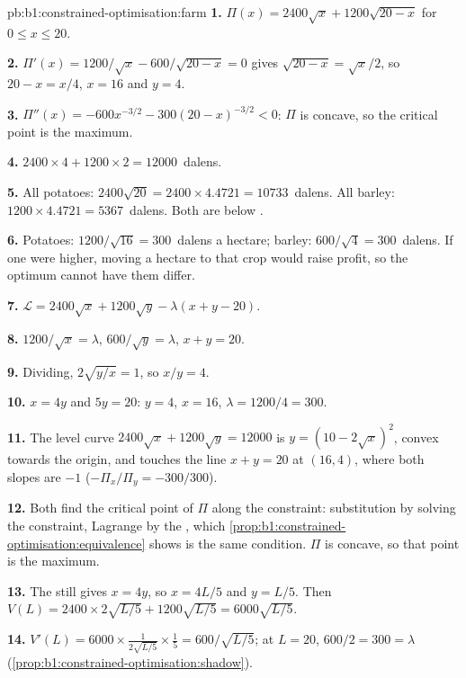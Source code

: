 \begin{solution}{pb:b1:constrained-optimisation:farm}
\textbf{1.} $\Pi(x) = 2400\sqrt x + 1200\sqrt{20 - x}$ for $0 \le x \le 20$.

\textbf{2.} $\Pi'(x) = 1200/\sqrt x - 600/\sqrt{20 - x} = 0$ gives
$\sqrt{20 - x} = \sqrt x/2$, so $20 - x = x/4$, $x = 16$ and $y = 4$.

\textbf{3.} $\Pi''(x) = -600x^{-3/2} - 300(20 - x)^{-3/2} < 0$: $\Pi$ is
concave, so the critical point is the maximum.

\textbf{4.} $2400 \times 4 + 1200 \times 2 = \num{12000}$~dalens.

\textbf{5.} All potatoes: $2400\sqrt{20} = 2400 \times 4.4721 = \num{10733}$~dalens.
All barley: $1200 \times 4.4721 = \num{5367}$~dalens. Both are below .

\textbf{6.} Potatoes: $1200/\sqrt{16} = \num{300}$~dalens a hectare; barley:
$600/\sqrt 4 = \num{300}$~dalens. If one were higher, moving a hectare to that crop
would raise profit, so the optimum cannot have them differ.

\textbf{7.} $\mathcal L = 2400\sqrt x + 1200\sqrt y - \lambda(x + y - 20)$.

\textbf{8.} $1200/\sqrt x = \lambda$, $600/\sqrt y = \lambda$, $x + y = 20$.

\textbf{9.} Dividing, $2\sqrt{y/x} = 1$, so $x/y = 4$.

\textbf{10.} $x = 4y$ and $5y = 20$: $y = 4$, $x = 16$, $\lambda = 1200/4 = 300$.

\textbf{11.} The level curve $2400\sqrt x + 1200\sqrt y = 12000$ is
$y = (10 - 2\sqrt x)^2$, convex towards the origin, and touches the line
$x + y = 20$ at $(16, 4)$, where both slopes are $-1$ ($-\Pi_x/\Pi_y = -300/300$).

\textbf{12.} Both find the critical point of $\Pi$ along the constraint:
substitution by solving the constraint, Lagrange by the ,
which \cref{prop:b1:constrained-optimisation:equivalence} shows is the same
condition. $\Pi$ is concave, so that point is the maximum.

\textbf{13.} The  still gives $x = 4y$, so $x = 4L/5$ and
$y = L/5$. Then $V(L) = 2400 \times 2\sqrt{L/5} + 1200\sqrt{L/5} = 6000\sqrt{L/5}$.

\textbf{14.} $V'(L) = 6000 \times \tfrac{1}{2\sqrt{L/5}} \times \tfrac15 =
600/\sqrt{L/5}$; at $L = 20$, $600/2 = 300 = \lambda$
(\cref{prop:b1:constrained-optimisation:shadow}).


\end{solution}
